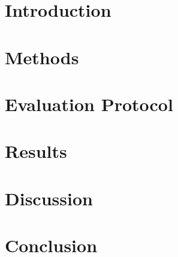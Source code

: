 \documentclass[aps,prb,reprint,superscriptaddress,floatfix,longbibliography]{revtex4-2}
\begin{document}
\section{Introduction}\label{sec:intro}


\section{Methods}\label{sec:method}


\section{Evaluation Protocol}\label{sec:setup}


\section{Results}\label{sec:results}


\section{Discussion}\label{sec:discussion}


\section{Conclusion}\label{sec:conclusion}

\end{document}
